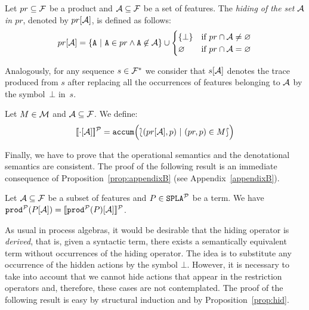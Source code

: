 \bdfn
  Let $pr\subseteq{\cal F}$ be a product and ${\cal A}\subseteq{\cal F}$
  be a set of features. The \emph{hiding of the set ${\cal A}$
    in $pr$}, denoted by $pr[{\cal A}]$, is defined as follows:
  \begin{displaymath}
    pr\hide{\calA} = \{\fA\ |\ \fA\in pr\wedge
    \fA\not\in\calA\}\cup
    \begin{cases}
      \{\bot\} & \mbox{if } pr\cap\calA\neq\emptyset\\
      \emptyset & \mbox{if } pr\cap\calA=\emptyset\\
    \end{cases}
  \end{displaymath}

  Analogously, for any sequence $s\in{\cal F}^{*}$ we consider that $s[{\cal A}]$ denotes the
  trace produced from $s$ after replacing all the occurrences of features belonging to ${\cal A}$ by the symbol~$\bot$ in~$s$.
\edfn

\bdfn
  Let $M\in{\cal M}$ and ${\cal A}\subseteq{\cal F}$. We define:
  \begin{displaymath}
    [\![\cdot[{\cal A}]]\!]^{\cal P} = \mathtt{accum}\Bigl(\lbag(pr[{\cal A}],p)\
    |\ (pr,p)\in M\rbag \Bigr)
  \end{displaymath}
\edfn

Finally, we have to prove that the
operational semantics and the denotational semantics are consistent.
%
The proof of the following result is an immediate consequence of Proposition~\ref{prop:appendixB} (see Appendix~\ref{appendixB}).

\bprop\label{prop:hid}Let ${\cal A}\subseteq {\cal F}$ be a subset of features and
  $P\in\mathtt{SPLA{^{\cal P}}}$ be a term. We have $ \mathtt{prod}^{\cal P}(P[{\cal A}])  = [\![\mathtt{prod}^{\cal P}(P)[{\cal A}]]\!]^{\cal P}$.
\eprop

As usual in process algebras, it would be desirable that the hiding operator is \emph{derived}, that is, given a syntactic term, there exists a semantically equivalent term without occurrences of the hiding operator.
The idea is to substitute any occurrence of
the hidden actions by the symbol $\bot$. However, it is necessary to take into account  that we cannot
hide actions that appear in the restriction operators and, therefore, these cases are not contemplated. The proof of the following result is easy by structural induction and by Proposition~\ref{prop:hid}.

